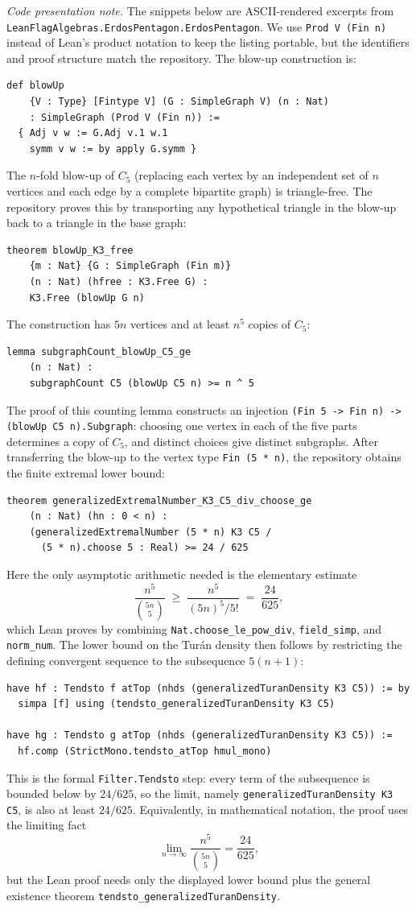 \documentclass{article}
\newcommand{\lean}[1]{\texttt{#1}}
\begin{document}
\emph{Code presentation note.}  The snippets below are ASCII-rendered excerpts
from \lean{LeanFlagAlgebras.ErdosPentagon.ErdosPentagon}.  We use
\lean{Prod V (Fin n)} instead of Lean's product notation to keep the listing
portable, but the identifiers and proof structure match the repository.
The blow-up construction is:
\begin{lstlisting}
def blowUp
    {V : Type} [Fintype V] (G : SimpleGraph V) (n : Nat)
    : SimpleGraph (Prod V (Fin n)) :=
  { Adj v w := G.Adj v.1 w.1
    symm v w := by apply G.symm }
\end{lstlisting}
The $n$-fold blow-up of $C_5$ (replacing each vertex by an independent set
of $n$ vertices and each edge by a complete bipartite graph) is triangle-free.
The repository proves this by transporting any hypothetical triangle in the
blow-up back to a triangle in the base graph:
\begin{lstlisting}
theorem blowUp_K3_free
    {m : Nat} {G : SimpleGraph (Fin m)}
    (n : Nat) (hfree : K3.Free G) :
    K3.Free (blowUp G n)
\end{lstlisting}
The construction has $5n$ vertices and at least $n^5$ copies of $C_5$:
\begin{lstlisting}
lemma subgraphCount_blowUp_C5_ge
    (n : Nat) :
    subgraphCount C5 (blowUp C5 n) >= n ^ 5
\end{lstlisting}
The proof of this counting lemma constructs an injection
\lean{(Fin 5 -> Fin n) -> (blowUp C5 n).Subgraph}: choosing one vertex in each
of the five parts determines a copy of $C_5$, and distinct choices give
distinct subgraphs.  After transferring the blow-up to the vertex type
\lean{Fin (5 * n)}, the repository obtains the finite extremal lower bound:
\begin{lstlisting}
theorem generalizedExtremalNumber_K3_C5_div_choose_ge
    (n : Nat) (hn : 0 < n) :
    (generalizedExtremalNumber (5 * n) K3 C5 /
      (5 * n).choose 5 : Real) >= 24 / 625
\end{lstlisting}
Here the only asymptotic arithmetic needed is the elementary estimate
\[
  \frac{n^5}{\binom{5n}{5}}
  \;\geq\;
  \frac{n^5}{(5n)^5 / 5!}
  \;=\;
  \frac{24}{625},
\]
which Lean proves by combining \lean{Nat.choose\_le\_pow\_div},
\lean{field\_simp}, and \lean{norm\_num}.  The lower bound on the Turán
density then follows by restricting the defining convergent sequence to the
subsequence $5(n+1)$:
\begin{lstlisting}
have hf : Tendsto f atTop (nhds (generalizedTuranDensity K3 C5)) := by
  simpa [f] using (tendsto_generalizedTuranDensity K3 C5)

have hg : Tendsto g atTop (nhds (generalizedTuranDensity K3 C5)) :=
  hf.comp (StrictMono.tendsto_atTop hmul_mono)
\end{lstlisting}
This is the formal \lean{Filter.Tendsto} step: every term of the subsequence is
bounded below by $24/625$, so the limit, namely
\lean{generalizedTuranDensity K3 C5}, is also at least $24/625$.
Equivalently, in mathematical notation, the proof uses the limiting fact
\[
  \lim_{n\to\infty} \frac{n^5}{\binom{5n}{5}} = \frac{24}{625},
\]
but the Lean proof needs only the displayed lower bound plus the general
existence theorem \lean{tendsto\_generalizedTuranDensity}.
\end{document}
